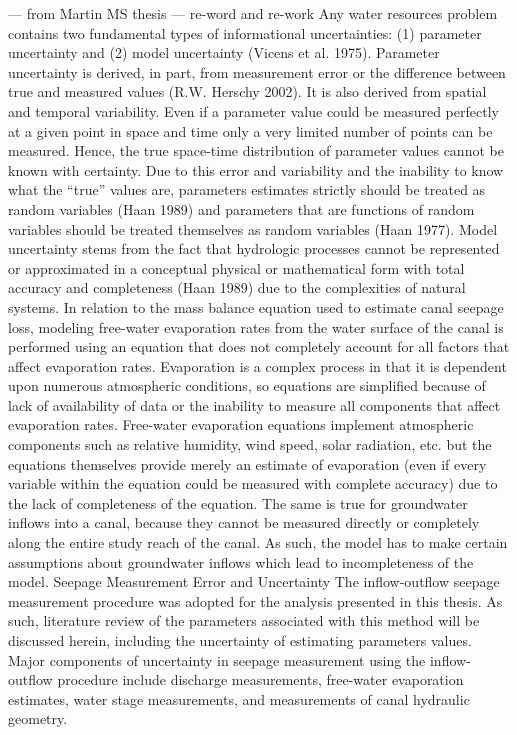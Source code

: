 \begin{linenumbers}
--- from Martin MS thesis --- re-word and re-work
Any water resources problem contains two fundamental types of informational uncertainties: (1) parameter uncertainty and (2) model uncertainty (Vicens et al. 1975).  Parameter uncertainty is derived, in part, from measurement error or the difference between true and measured values (R.W. Herschy 2002).  It is also derived from spatial and temporal variability.  Even if a parameter value could be measured perfectly at a given point in space and time only a very limited number of points can be measured.  Hence, the true space-time distribution of parameter values cannot be known with certainty.  Due to this error and variability and the inability to know what the “true” values are, parameters estimates strictly should be treated as random variables (Haan 1989) and parameters that are functions of random variables should be treated themselves as random variables (Haan 1977).
Model uncertainty stems from the fact that hydrologic processes cannot be represented or approximated in a conceptual physical or mathematical form with total accuracy and completeness (Haan 1989) due to the complexities of natural systems. In relation to the mass balance equation used to estimate canal seepage loss, modeling free-water evaporation rates from the water surface of the canal is performed using an equation that does not completely account for all factors that affect evaporation rates.  Evaporation is a complex process in that it is dependent upon numerous atmospheric conditions, so equations are simplified because of lack of availability of data or the inability to measure all components that affect evaporation rates.  Free-water evaporation equations implement atmospheric components such as relative humidity, wind speed, solar radiation, etc. but the equations themselves provide merely an estimate of evaporation (even if every variable within the equation could be measured with complete accuracy) due to the lack of completeness of the equation.  The same is true for groundwater inflows into a canal, because they cannot be measured directly or completely along the entire study reach of the canal.  As such, the model has to make certain assumptions about groundwater inflows which lead to incompleteness of the model.  
Seepage Measurement Error and Uncertainty
The inflow-outflow seepage measurement procedure was adopted for the analysis presented in this thesis.  As such, literature review of the parameters associated with this method will be discussed herein, including the uncertainty of estimating parameters values.  Major components of uncertainty in seepage measurement using the inflow-outflow procedure include discharge measurements, free-water evaporation estimates, water stage measurements, and measurements of canal hydraulic geometry.

\end{linenumbers}
